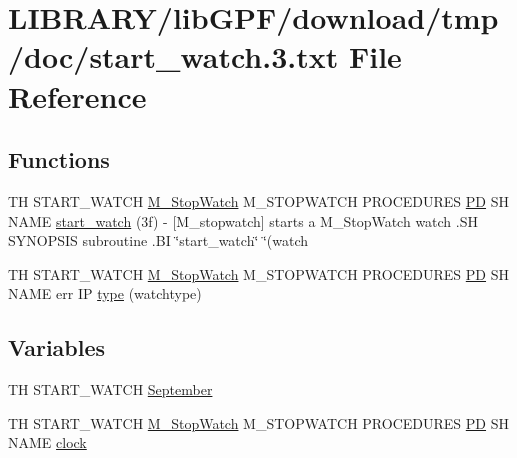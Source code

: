 \hypertarget{start__watch_83_8txt}{}\section{L\+I\+B\+R\+A\+R\+Y/lib\+G\+P\+F/download/tmp/doc/start\+\_\+watch.3.txt File Reference}
\label{start__watch_83_8txt}
\subsection*{Functions}
\begin{DoxyCompactItemize}
\item 
TH S\+T\+A\+R\+T\+\_\+\+W\+A\+T\+CH \hyperlink{option__stopwatch_83_8txt_aa2011fc45a5e502e87ee50996a8a9305}{M\+\_\+\+Stop\+Watch} M\+\_\+\+S\+T\+O\+P\+W\+A\+T\+CH P\+R\+O\+C\+E\+D\+U\+R\+ES \hyperlink{what__overview_81_8txt_a85f26da5a4481fbdb0d9c79f2b94de3e}{PD} SH N\+A\+ME \hyperlink{start__watch_83_8txt_ab7768fefc46b7d8afde391ec2cdf93f8}{start\+\_\+watch} (3f) -\/ \mbox{[}\+M\+\_\+stopwatch\mbox{]} starts a M\+\_\+\+Stop\+Watch watch .\+S\+H S\+Y\+N\+O\+P\+S\+I\+S subroutine .\+B\+I \char`\"{}start\+\_\+watch\char`\"{} \char`\"{}(watch
\item 
TH S\+T\+A\+R\+T\+\_\+\+W\+A\+T\+CH \hyperlink{option__stopwatch_83_8txt_aa2011fc45a5e502e87ee50996a8a9305}{M\+\_\+\+Stop\+Watch} M\+\_\+\+S\+T\+O\+P\+W\+A\+T\+CH P\+R\+O\+C\+E\+D\+U\+R\+ES \hyperlink{what__overview_81_8txt_a85f26da5a4481fbdb0d9c79f2b94de3e}{PD} SH N\+A\+ME err IP \hyperlink{start__watch_83_8txt_afb126b5ee09c3784b94acaa05b3b2d5f}{type} (watchtype)
\end{DoxyCompactItemize}
\subsection*{Variables}
\begin{DoxyCompactItemize}
\item 
TH S\+T\+A\+R\+T\+\_\+\+W\+A\+T\+CH \hyperlink{start__watch_83_8txt_aa28beaa3f308bdbe703fa8484f87082d}{September}
\item 
TH S\+T\+A\+R\+T\+\_\+\+W\+A\+T\+CH \hyperlink{option__stopwatch_83_8txt_aa2011fc45a5e502e87ee50996a8a9305}{M\+\_\+\+Stop\+Watch} M\+\_\+\+S\+T\+O\+P\+W\+A\+T\+CH P\+R\+O\+C\+E\+D\+U\+R\+ES \hyperlink{what__overview_81_8txt_a85f26da5a4481fbdb0d9c79f2b94de3e}{PD} SH N\+A\+ME \hyperlink{start__watch_83_8txt_aeadc6e1a3f40066d313c6190ab99a7fe}{clock}
\end{DoxyCompactItemize}


